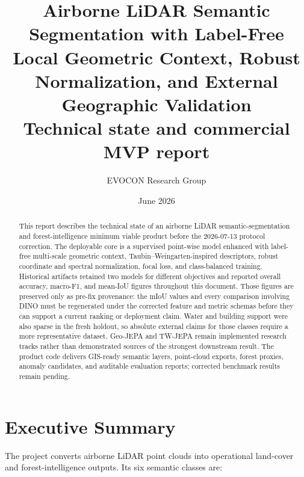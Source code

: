 \documentclass[11pt,a4paper]{article}
\title{\textbf{Airborne LiDAR Semantic Segmentation with Label-Free Local Geometric Context, Robust Normalization, and External Geographic Validation}\\[0.45em]
\large Technical state and commercial MVP report}
\author{EVOCON Research Group}
\date{June 2026}
\begin{document}
\maketitle

\begin{center}
\end{center}

\begin{abstract}
This report describes the technical state of an airborne LiDAR semantic-segmentation and forest-intelligence minimum viable product before the 2026-07-13 protocol correction. The deployable core is a supervised point-wise model enhanced with label-free multi-scale geometric context, Taubin--Weingarten-inspired descriptors, robust coordinate and spectral normalization, focal loss, and class-balanced training. Historical artifacts retained two models for different objectives and reported overall accuracy, macro-F1, and mean-IoU figures throughout this document. Those figures are preserved only as pre-fix provenance: the mIoU values and every comparison involving DINO must be regenerated under the corrected feature and metric schemas before they can support a current ranking or deployment claim. Water and building support were also sparse in the fresh holdout, so absolute external claims for those classes require a more representative dataset. Geo-JEPA and TW-JEPA remain implemented research tracks rather than demonstrated sources of the strongest downstream result. The product code delivers GIS-ready semantic layers, point-cloud exports, forest proxies, anomaly candidates, and auditable evaluation reports; corrected benchmark results remain pending.
\end{abstract}

\tableofcontents
\newpage

\section{Executive Summary}

The project converts airborne LiDAR point clouds into operational land-cover and forest-intelligence outputs. Its six semantic classes are:
\end{document}
